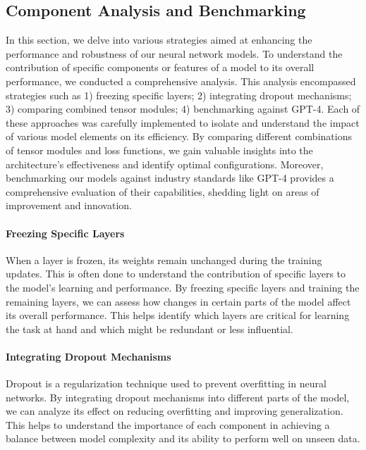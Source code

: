 \subsection{Component Analysis and Benchmarking}
\label{subsec:4_component_analysis_and_benchmarking}
In this section, we delve into various strategies aimed at enhancing the performance and robustness of our neural network models. To understand the contribution of specific components or features of a model to its overall performance, we conducted a comprehensive analysis. This analysis encompassed strategies such as 1) freezing specific layers; 2) integrating dropout mechanisms; 3) comparing combined tensor modules; 4) benchmarking against GPT-4. Each of these approaches was carefully implemented to isolate and understand the impact of various model elements on its efficiency. By comparing different combinations of tensor modules and loss functions, we gain valuable insights into the architecture's effectiveness and identify optimal configurations. Moreover, benchmarking our models against industry standards like GPT-4 provides a comprehensive evaluation of their capabilities, shedding light on areas of improvement and innovation.

\paragraph*{Freezing Specific Layers}
\label{par:4_freezing_specific_layers}
When a layer is frozen, its weights remain unchanged during the training updates. This is often done to understand the contribution of specific layers to the model's learning and performance. By freezing specific layers and training the remaining layers, we can assess how changes in certain parts of the model affect its overall performance. This helps identify which layers are critical for learning the task at hand and which might be redundant or less influential.

\paragraph*{Integrating Dropout Mechanisms}
\label{par:4_integrating_dropout_mechanisms} 
Dropout is a regularization technique used to prevent overfitting in neural networks. By integrating dropout mechanisms into different parts of the model, we can analyze its effect on reducing overfitting and improving generalization. This helps to understand the importance of each component in achieving a balance between model complexity and its ability to perform well on unseen data.

